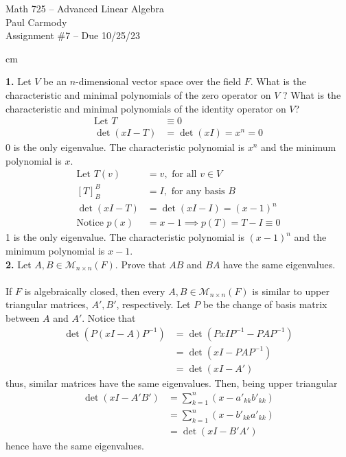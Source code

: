 \documentclass[11pt]{amsart}
\theoremstyle{definition}  %
\begin{document}
\begin{center}
\Large{Math 725 -- Advanced Linear Algebra}\\
\large{Paul Carmody}\\
Assignment \#7 -- Due 10/25/23
\end{center}

 cm

\noindent
{\bf 1.} Let $V$ be an $n$-dimensional vector space over the field $F$. What is the characteristic and minimal polynomials of the zero operator on $V$ ?
What is the characteristic and minimal polynomials of the identity operator on $V$? \\
\begin{align*}
	\text{Let } T &\equiv 0  \\
	\det(xI-T) &= \det(xI) = x^n = 0
\end{align*}0 is the only eigenvalue.  The characteristic polynomial is $x^n$ and the minimum polynomial is $x$.
\begin{align*}
	\text{Let } T(v) &= v, \text{ for all } v \in V \\
	[T]_B^B &= I, \text{ for any basis }B\\
	\det(xI-T) &= \det(xI-I) = (x-1)^n \\
	\text{Notice } p(x) &= x-1 \implies p(T) = T-I \equiv 0
\end{align*}1 is the only eigenvalue.  The characteristic polynomial is $(x-1)^n$ and the minimum polynomial is $x-1$.\\

\vskip 0.1cm
\noindent
{\bf 2.}  Let $A, B \in \mathcal{M}_{n \times n}(F)$.  Prove that $AB$ and $BA$ have the same eigenvalues.\\
\\
If $F$ is algebraically closed, then every $A,B \in \mathcal{M}_{n\times n}(F)$ is similar to upper triangular matrices, $A', B'$, respectively. Let $P$ be the change of basis matrix between $A$ and $A'$.  Notice that 
\begin{align*}
	\det(P(xI-A)P^{-1}) &= \det(PxIP^{-1}-PAP^{-1}) \\
		&= \det(xI-PAP^{-1})\\
		&= \det(xI-A')
\end{align*}thus, similar matrices have the same eigenvalues. Then, being upper triangular
\begin{align*}
	\det(xI-A'B') &= \sum_{k=1}^n (x-a'_{kk}b'_{kk})\\
	 &= \sum_{k=1}^n (x-b'_{kk}a'_{kk})\\
	 &=\det(xI-B'A')
\end{align*} hence have the same eigenvalues.
\end{document}
